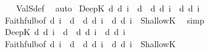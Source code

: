 \begin{isabellebody}
%
\isadelimproof
\ \ %
\endisadelimproof
%
\isatagproof
{}\isamarkupfalse%
\ ValS{\isacharunderscore}{\kern0pt}def\ \isamarkupfalse%
\ auto%
\endisatagproof
{\isafoldproof}%
%
\isadelimproof
\isanewline
%
\endisadelimproof
\isanewline
{}\isamarkupfalse%
\ DeepK{\isasymB}{\isacharcolon}{\kern0pt}\ {\isachardoublequoteopen}{\isasymTurnstile}\isactrlsup d\ {\isacharparenleft}{\kern0pt}{\isasymB}\isactrlsup d\ i\ {\isacharparenleft}{\kern0pt}{\isasymphi}\ {\isasymsupset}\isactrlsup d\ {\isasympsi}{\isacharparenright}{\kern0pt}\ {\isasymsupset}\isactrlsup d\ {\isacharparenleft}{\kern0pt}{\isasymB}\isactrlsup d\ i\ {\isasymphi}\ {\isasymsupset}\isactrlsup d\ {\isasymB}\isactrlsup d\ i\ {\isasympsi}{\isacharparenright}{\kern0pt}{\isacharparenright}{\kern0pt}{\isachardoublequoteclose}\isanewline
%
\isadelimproof
\ \ %
\endisadelimproof
%
\isatagproof
{}\isamarkupfalse%
\ Faithful{}b{\isacharbrackleft}{\kern0pt}of\ {\isachardoublequoteopen}{\isasymB}\isactrlsup d\ i\ {\isacharparenleft}{\kern0pt}{\isasymphi}\ {\isasymsupset}\isactrlsup d\ {\isasympsi}{\isacharparenright}{\kern0pt}\ {\isasymsupset}\isactrlsup d\ {\isacharparenleft}{\kern0pt}{\isasymB}\isactrlsup d\ i\ {\isasymphi}\ {\isasymsupset}\isactrlsup d\ {\isasymB}\isactrlsup d\ i\ {\isasympsi}{\isacharparenright}{\kern0pt}{\isachardoublequoteclose}{\isacharbrackright}{\kern0pt}\ ShallowK{\isasymB}\ \isamarkupfalse%
\ simp%
\endisatagproof
{\isafoldproof}%
%
\isadelimproof
\isanewline
%
\endisadelimproof
{}\isamarkupfalse%
\ DeepK{\isasymD}{\isacharcolon}{\kern0pt}\ {\isachardoublequoteopen}{\isasymTurnstile}\isactrlsup d\ {\isacharparenleft}{\kern0pt}{\isasymD}\isactrlsup d\ i\ {\isacharparenleft}{\kern0pt}{\isasymphi}\ {\isasymsupset}\isactrlsup d\ {\isasympsi}{\isacharparenright}{\kern0pt}\ {\isasymsupset}\isactrlsup d\ {\isacharparenleft}{\kern0pt}{\isasymD}\isactrlsup d\ i\ {\isasymphi}\ {\isasymsupset}\isactrlsup d\ {\isasymD}\isactrlsup d\ i\ {\isasympsi}{\isacharparenright}{\kern0pt}{\isacharparenright}{\kern0pt}{\isachardoublequoteclose}\isanewline
%
\isadelimproof
\ \ %
\endisadelimproof
%
\isatagproof
{}\isamarkupfalse%
\ Faithful{}b{\isacharbrackleft}{\kern0pt}of\ {\isachardoublequoteopen}{\isasymD}\isactrlsup d\ i\ {\isacharparenleft}{\kern0pt}{\isasymphi}\ {\isasymsupset}\isactrlsup d\ {\isasympsi}{\isacharparenright}{\kern0pt}\ {\isasymsupset}\isactrlsup d\ {\isacharparenleft}{\kern0pt}{\isasymD}\isactrlsup d\ i\ {\isasymphi}\ {\isasymsupset}\isactrlsup d\ {\isasymD}\isactrlsup d\ i\ {\isasympsi}{\isacharparenright}{\kern0pt}{\isachardoublequoteclose}{\isacharbrackright}{\kern0pt}\ ShallowK{\isasymD}\ \isamarkupfalse%

\end{isabellebody}
